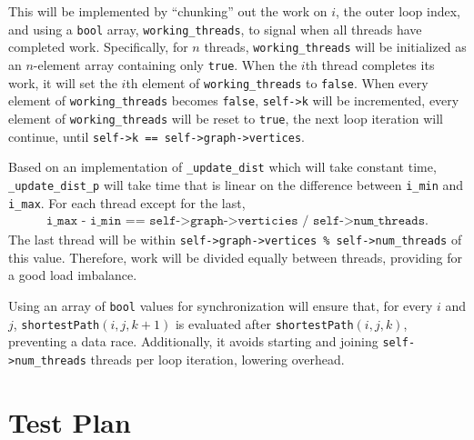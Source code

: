 \documentclass{article}
\begin{document}
This will be implemented by ``chunking'' out the work on $i$, the
outer loop index, and using a \texttt{bool} array,
\texttt{working\_threads}, to signal when all threads have completed
work. Specifically, for $n$ threads, \texttt{working\_threads} will be
initialized as an $n$-element array containing only
\texttt{true}. When the $i$th thread completes its work, it will set
the $i$th element of \texttt{working\_threads} to \texttt{false}. When
every element of \texttt{working\_threads} becomes \texttt{false}, \texttt{self->k} will be incremented, every element of \texttt{working\_threads} will be reset to
\texttt{true}, the next
loop iteration will continue, until \texttt{self->k == self->graph->vertices}.

Based on an implementation of \texttt{\_update\_dist} which will take
constant time, \texttt{\_update\_dist\_p} will take time that is linear
on the difference between \texttt{i\_min} and \texttt{i\_max}. For
each thread except for the last, 
\begin{align*}
\texttt{i\_max - i\_min ==
  self->graph->verticies / self->num\_threads}.
\end{align*}
The last thread will
be within \texttt{self->graph->vertices \%  self->num\_threads} of
this value. Therefore, work will be divided equally between threads,
providing for a good load imbalance.

Using an array of \texttt{bool} values for synchronization will ensure
that, for every $i$ and $j$, \texttt{shortestPath}$(i, j, k+1)$ is
evaluated after \texttt{shortestPath}$(i, j, k)$, preventing a data
race. Additionally, it avoids starting and joining
\texttt{self->num\_threads} threads per loop iteration, lowering
overhead. 

\newpage

\section{Test Plan}
\end{document}
